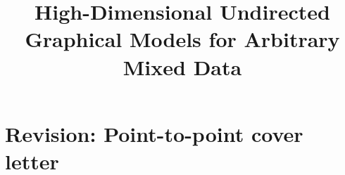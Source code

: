 \documentclass[ejs]{imsart}
\theoremstyle{plain}
\newcounter{reviewer}
\newcounter{point}[reviewer]
\begin{document}
\section*{Revision: Point-to-point cover letter}



\clearpage\newpage
\setcounter{page}{1}

\begin{frontmatter}

    \title{High-Dimensional Undirected Graphical Models for Arbitrary Mixed Data}

    \begin{aug}
        \author{ 
            }


        \address{Technical University of Munich \\
            TUM School of Computation, Information and Technology \\
            }

        \author{ 
            }

        \address{German Center for Neurodegenerative Diseases\\
            Bonn, Germany\\
            }

        \author{ 
            }

        \address{Technical University of Munich \\
            TUM School of Computation, Information and Technology\\
            }

        \author{ 
            }

        \address{German Center for Neurodegenerative Diseases\\
            Bonn, Germany \\}
        \address{
            University of Cambridge \\
            MRC Biostatistics Unit \\
            }



\end{aug}
\end{frontmatter}
\end{document}
